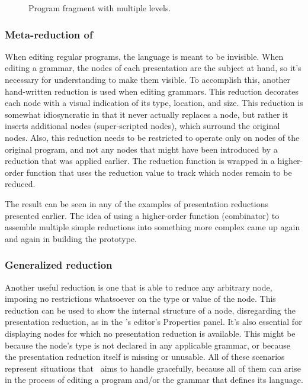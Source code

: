 \begin{figure}[ht]
\caption{\label{fig-levels} Program fragment with multiple levels.}
\end{figure}


\subsubsection{Meta-reduction of }
When editing regular programs, the  language is meant to be invisible. When editing a grammar, the  nodes of each presentation are the subject at hand, so it's necessary for understanding to make them visible. To accomplish this, another hand-written reduction is used when editing grammars. This reduction decorates each node with a visual indication of its type, location, and size. This reduction is somewhat idiosyncratic in that it never actually replaces a node, but rather it inserts additional nodes (super-scripted  nodes), which surround the original nodes. Also, this reduction needs to be restricted to operate only on  nodes of the original program, and not any nodes that might have been introduced by a reduction that was applied earlier. The reduction function is wrapped in a higher-order function that uses the reduction value to track which nodes remain to be reduced.

The result can be seen in any of the examples of presentation reductions presented earlier. The idea of using a higher-order function (combinator) to assemble multiple simple reductions into something more complex came up again and again in building the prototype.


\subsubsection{Generalized reduction}
Another useful reduction is one that is able to reduce any arbitrary node, imposing no restrictions whatsoever on the type or value of the node. This reduction can be used to show the internal structure of a node, disregarding the presentation reduction, as in the \Meta's editor's Properties panel. It's also essential for displaying nodes for which no presentation reduction is available. This might be because the node's type is not declared in any applicable grammar, or because the presentation reduction itself is missing or unusable. All of these scenarios represent situations that \Meta\ aims to handle gracefully, because all of them can arise in the process of editing a program and/or the grammar that defines its language.

